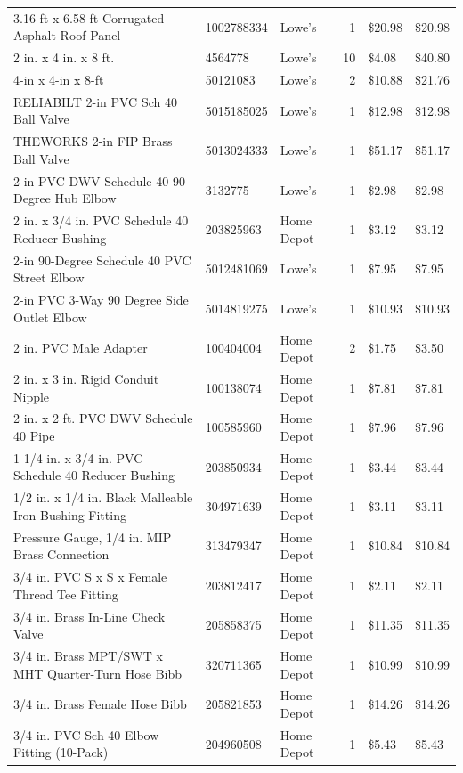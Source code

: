 \documentclass[12pt]{article}
\begin{document}
\begin{tabular}{@{}lllrll@{}}
3.16-ft x 6.58-ft Corrugated Asphalt Roof Panel & 1002788334 & Lowe's & 1 & \$20.98 & \$20.98 \\
2 in. x 4 in. x 8 ft. #2 Pine Pressure-Treated & 4564778 & Lowe's & 10 & \$4.08 & \$40.80 \\
4-in x 4-in x 8-ft #2, Pressure Treated Lumber & 50121083 & Lowe's & 2 & \$10.88 & \$21.76 \\
RELIABILT 2-in PVC Sch 40 Ball Valve & 5015185025 & Lowe's & 1 & \$12.98 & \$12.98 \\
THEWORKS 2-in FIP Brass Ball Valve & 5013024333 & Lowe's & 1 & \$51.17 & \$51.17 \\
2-in PVC DWV Schedule 40 90 Degree Hub Elbow & 3132775 & Lowe's & 1 & \$2.98 & \$2.98 \\
2 in. x 3/4 in. PVC Schedule 40 Reducer Bushing & 203825963 & Home Depot & 1 & \$3.12 & \$3.12 \\
2-in 90-Degree Schedule 40 PVC Street Elbow & 5012481069 & Lowe's & 1 & \$7.95 & \$7.95 \\
2-in PVC 3-Way 90 Degree Side Outlet Elbow & 5014819275 & Lowe's & 1 & \$10.93 & \$10.93 \\
2 in. PVC Male Adapter & 100404004 & Home Depot & 2 & \$1.75 & \$3.50 \\
2 in. x 3 in. Rigid Conduit Nipple & 100138074 & Home Depot & 1 & \$7.81 & \$7.81 \\
2 in. x 2 ft. PVC DWV Schedule 40 Pipe & 100585960 & Home Depot & 1 & \$7.96 & \$7.96 \\
1-1/4 in. x 3/4 in. PVC Schedule 40 Reducer Bushing & 203850934 & Home Depot & 1 & \$3.44 & \$3.44 \\
1/2 in. x 1/4 in. Black Malleable Iron Bushing Fitting & 304971639 & Home Depot & 1 & \$3.11 & \$3.11 \\
Pressure Gauge, 1/4 in. MIP Brass Connection & 313479347 & Home Depot & 1 & \$10.84 & \$10.84 \\
3/4 in. PVC S x S x Female Thread Tee Fitting & 203812417 & Home Depot & 1 & \$2.11 & \$2.11 \\
3/4 in. Brass In-Line Check Valve & 205858375 & Home Depot & 1 & \$11.35 & \$11.35 \\
3/4 in. Brass MPT/SWT x MHT Quarter-Turn Hose Bibb & 320711365 & Home Depot & 1 & \$10.99 & \$10.99 \\
3/4 in. Brass Female Hose Bibb & 205821853 & Home Depot & 1 & \$14.26 & \$14.26 \\
3/4 in. PVC Sch 40 Elbow Fitting (10-Pack) & 204960508 & Home Depot & 1 & \$5.43 & \$5.43 \\

\end{tabular}
\end{document}
